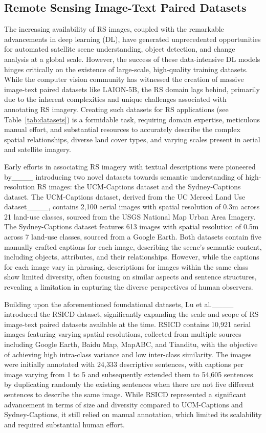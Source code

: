 \subsection{Remote Sensing Image-Text Paired Datasets}
The increasing availability of RS images, coupled with the remarkable advancements in deep learning (DL), have generated unprecedented opportunities for automated satellite scene understanding, object detection, and change analysis at a global scale. However, the success of these data-intensive DL models hinges critically on the existence of large-scale, high-quality training datasets. While the computer vision community has witnessed the creation of massive image-text paired datasets like LAION-5B, the RS domain lags behind, primarily due to the inherent complexities and unique challenges associated with annotating RS imagery. Creating such datasets for RS applications (see Table~\ref{tab:datasets}) is a formidable task, requiring domain expertise, meticulous manual effort, and substantial resources to accurately describe the complex spatial relationships, diverse land cover types, and varying scales present in aerial and satellite imagery.

Early efforts in associating RS imagery with textual descriptions were pioneered by____ introducing two novel datasets towards semantic understanding of high-resolution RS images: the UCM-Captions dataset and the Sydney-Captions dataset. The UCM-Captions dataset, derived from the UC Merced Land Use dataset____, contains 2,100 aerial images with spatial resolution of 0.3m across 21 land-use classes, sourced from the USGS National Map Urban Area Imagery. The Sydney-Captions dataset features 613 images with spatial resolution of 0.5m across 7 land-use classes, sourced from a Google Earth. Both datasets contain five manually crafted captions for each image, describing the scene's semantic content, including objects, attributes, and their relationships. However, while the captions for each image vary in phrasing, descriptions for images within the same class show limited diversity, often focusing on similar aspects and sentence structures, revealing a limitation in capturing the diverse perspectives of human observers.

Building upon the aforementioned foundational datasets, Lu et al.____ introduced the RSICD dataset, significantly expanding the scale and scope of RS image-text paired datasets available at the time. RSICD contains 10,921 aerial images featuring varying spatial resolutions, collected from multiple sources including Google Earth, Baidu Map, MapABC, and Tianditu, with the objective of achieving high intra-class variance and low inter-class similarity. The images were initially annotated with 24,333 descriptive sentences, with captions per image varying from 1 to 5 and subsequently extended them to 54,605 sentences by duplicating randomly the existing sentences when there are not five different sentences to describe the same image. While RSICD represented a significant advancement in terms of size and diversity compared to UCM-Captions and Sydney-Captions, it still relied on manual annotation, which limited its scalability and required substantial human effort.

